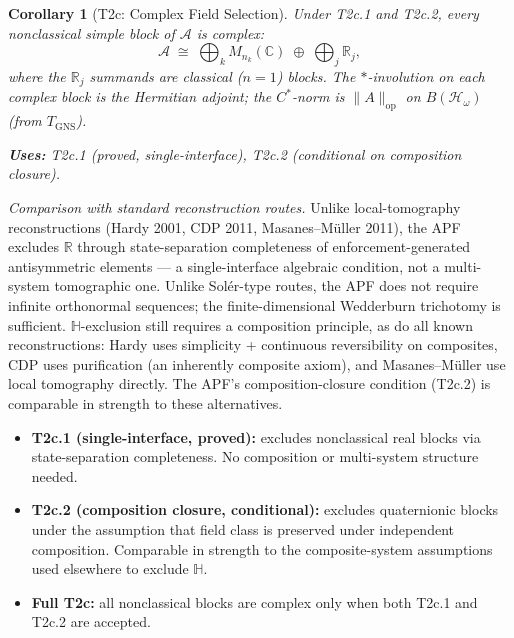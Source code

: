 \documentclass[11pt,a4paper]{article}
\newtheorem{corollary}[theorem]{Corollary}
\theoremstyle{definition}
\begin{document}
\begin{corollary}[T2c: Complex Field Selection]\label{cor:T2c}
Under T2c.1 and T2c.2, every nonclassical simple block of $\mathcal{A}$ is complex:
\[
\mathcal{A} \;\cong\; \bigoplus_k M_{n_k}(\mathbb{C}) \;\oplus\; \bigoplus_j \mathbb{R}_j,
\]
where the $\mathbb{R}_j$ summands are classical ($n = 1$) blocks.  The $*$-involution on each complex block is the Hermitian adjoint; the $C^*$-norm is $\|A\|_{\mathrm{op}}$ on $B(\mathcal{H}_\omega)$ (from $T_{\mathrm{GNS}}$).

\smallskip\noindent\textbf{Uses:} T2c.1 (proved, single-interface), T2c.2 (conditional on composition closure).
\end{corollary}

\smallskip\noindent\textit{Comparison with standard reconstruction routes.}  Unlike local-tomography reconstructions (Hardy 2001, CDP 2011, Masanes--M\"uller 2011), the APF excludes $\mathbb{R}$ through state-separation completeness of enforcement-generated antisymmetric elements --- a single-interface algebraic condition, not a multi-system tomographic one.  Unlike Sol\'er-type routes, the APF does not require infinite orthonormal sequences; the finite-dimensional Wedderburn trichotomy is sufficient.  $\mathbb{H}$-exclusion still requires a composition principle, as do all known reconstructions: Hardy uses simplicity + continuous reversibility on composites, CDP uses purification (an inherently composite axiom), and Masanes--M\"uller use local tomography directly.  The APF's composition-closure condition (T2c.2) is comparable in strength to these alternatives.

\begin{tcolorbox}[apfbox, title={Field-Selection Status}]
\begin{itemize}[nosep,leftmargin=1.5em]
\item \textbf{T2c.1 (single-interface, proved):} excludes nonclassical real blocks via state-separation completeness.  No composition or multi-system structure needed.
\item \textbf{T2c.2 (composition closure, conditional):} excludes quaternionic blocks under the assumption that field class is preserved under independent composition.  Comparable in strength to the composite-system assumptions used elsewhere to exclude $\mathbb{H}$.
\item \textbf{Full T2c:} all nonclassical blocks are complex only when both T2c.1 and T2c.2 are accepted.
\end{itemize}
\end{tcolorbox}
\end{document}
